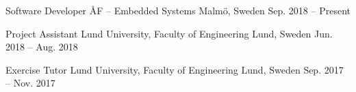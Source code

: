 \cventry
{Software Developer} %
{ÅF -- Embedded Systems} %
{Malmö, Sweden} %
{Sep. 2018 -- Present } %
{ }

\cventry
{Project Assistant} %
{Lund University, Faculty of Engineering} %
{Lund, Sweden} %
{Jun. 2018 -- Aug. 2018 } %
{ }

\cventry
{Exercise Tutor} %
{Lund University, Faculty of Engineering} %
{Lund, Sweden} %
{Sep. 2017 -- Nov. 2017 } %
{ }

